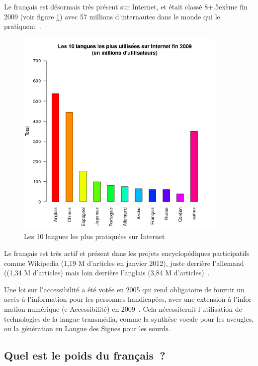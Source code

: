 \documentclass[]{../metanetpaper}
\begin{document}
\begin{french}
\begin{multicols}{2}
Le français est désormais très présent sur Internet, et était classé
8\raise+.5ex\hbox{ème} fin 2009 (voir figure \ref{fig:internettop10})
avec 57 millions d{\mbox '}internautes dans le monde qui le pratiquent~\cite{internettop10}.

\begin{figure}[!ht]
\begin{center}
 \includegraphics[height=4.0in]{../_media/french/french_pix2_top_10_Internet_languages_2010.png}
  \caption{Les 10 langues les plus pratiquées sur Internet~\cite{internettop10}}
  \label{fig:internettop10}
\end{center}
\end{figure}

Le français est très actif et présent dans les projets encyclopédiques participatifs comme Wikipedia (1,19 M d'articles en janvier 2012), juste derrière l'allemand ((1,34 M d'articles) mais loin derrière l'anglais (3,84 M d'articles)~\cite{wikipediastats}.

Une loi sur l{\mbox '}accessibilité a été votée en 2005 qui rend
obligatoire de fournir un accès à l{\mbox '}information pour les
personnes handicapées, avec une extension à l{\mbox '}information
numérique (e-Accessibilité) en 2009~\cite{loi}. Cela nécessiterait
l{\mbox '}utilisation de technologies de la langue transmédia, comme
la synthèse vocale pour les aveugles, ou la génération en Langue des
Signes pour les sourds.

\subsection{Quel est le poids du français~?}


\end{multicols}
\end{french}
\end{document}
